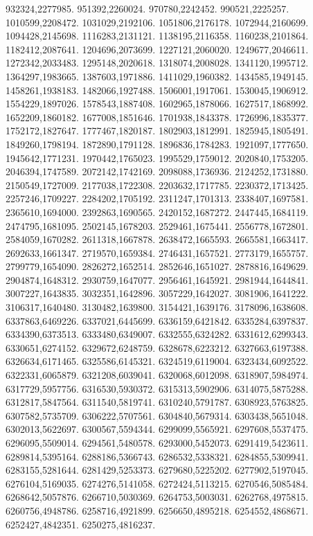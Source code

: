 932324,2277985.
951392,2260024.
970780,2242452.
990521,2225257.
1010599,2208472.
1031029,2192106.
1051806,2176178.
1072944,2160699.
1094428,2145698.
1116283,2131121.
1138195,2116358.
1160238,2101864.
1182412,2087641.
1204696,2073699.
1227121,2060020.
1249677,2046611.
1272342,2033483.
1295148,2020618.
1318074,2008028.
1341120,1995712.
1364297,1983665.
1387603,1971886.
1411029,1960382.
1434585,1949145.
1458261,1938183.
1482066,1927488.
1506001,1917061.
1530045,1906912.
1554229,1897026.
1578543,1887408.
1602965,1878066.
1627517,1868992.
1652209,1860182.
1677008,1851646.
1701938,1843378.
1726996,1835377.
1752172,1827647.
1777467,1820187.
1802903,1812991.
1825945,1805491.
1849260,1798194.
1872890,1791128.
1896836,1784283.
1921097,1777650.
1945642,1771231.
1970442,1765023.
1995529,1759012.
2020840,1753205.
2046394,1747589.
2072142,1742169.
2098088,1736936.
2124252,1731880.
2150549,1727009.
2177038,1722308.
2203632,1717785.
2230372,1713425.
2257246,1709227.
2284202,1705192.
2311247,1701313.
2338407,1697581.
2365610,1694000.
2392863,1690565.
2420152,1687272.
2447445,1684119.
2474795,1681095.
2502145,1678203.
2529461,1675441.
2556778,1672801.
2584059,1670282.
2611318,1667878.
2638472,1665593.
2665581,1663417.
2692633,1661347.
2719570,1659384.
2746431,1657521.
2773179,1655757.
2799779,1654090.
2826272,1652514.
2852646,1651027.
2878816,1649629.
2904874,1648312.
2930759,1647077.
2956461,1645921.
2981944,1644841.
3007227,1643835.
3032351,1642896.
3057229,1642027.
3081906,1641222.
3106317,1640480.
3130482,1639800.
3154421,1639176.
3178096,1638608.
6337863,6469226.
6337021,6445699.
6336159,6421842.
6335284,6397837.
6334390,6373513.
6333480,6349007.
6332555,6324282.
6331612,6299343.
6330651,6274152.
6329672,6248759.
6328678,6223212.
6327663,6197388.
6326634,6171465.
6325586,6145321.
6324519,6119004.
6323434,6092522.
6322331,6065879.
6321208,6039041.
6320068,6012098.
6318907,5984974.
6317729,5957756.
6316530,5930372.
6315313,5902906.
6314075,5875288.
6312817,5847564.
6311540,5819741.
6310240,5791787.
6308923,5763825.
6307582,5735709.
6306222,5707561.
6304840,5679314.
6303438,5651048.
6302013,5622697.
6300567,5594344.
6299099,5565921.
6297608,5537475.
6296095,5509014.
6294561,5480578.
6293000,5452073.
6291419,5423611.
6289814,5395164.
6288186,5366743.
6286532,5338321.
6284855,5309941.
6283155,5281644.
6281429,5253373.
6279680,5225202.
6277902,5197045.
6276104,5169035.
6274276,5141058.
6272424,5113215.
6270546,5085484.
6268642,5057876.
6266710,5030369.
6264753,5003031.
6262768,4975815.
6260756,4948786.
6258716,4921899.
6256650,4895218.
6254552,4868671.
6252427,4842351.
6250275,4816237.
